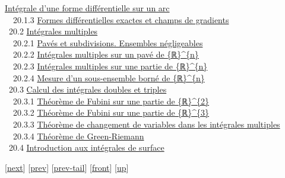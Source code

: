 \documentclass[]{article}
\begin{document}
\href{coursse104.html\#x127-59100020.1.2}{Intégrale d'une forme
différentielle sur un arc} \\ ~~20.1.3
\href{coursse104.html\#x127-59200020.1.3}{Formes différentielles exactes
et champs de gradients} \\ ~20.2
\href{coursse105.html\#x128-59300020.2}{Intégrales multiples} \\
~~20.2.1 \href{coursse105.html\#x128-59400020.2.1}{Pavés et
subdivisions. Ensembles négligeables} \\ ~~20.2.2
\href{coursse105.html\#x128-59500020.2.2}{Intégrales multiples sur un
pavé de \{ℝ\}\^{}\{n\}} \\ ~~20.2.3
\href{coursse105.html\#x128-59600020.2.3}{Intégrales multiples sur une
partie de \{ℝ\}\^{}\{n\}} \\ ~~20.2.4
\href{coursse105.html\#x128-59700020.2.4}{Mesure d'un sous-ensemble
borné de \{ℝ\}\^{}\{n\}} \\ ~20.3
\href{coursse106.html\#x129-59800020.3}{Calcul des intégrales doubles et
triples} \\ ~~20.3.1 \href{coursse106.html\#x129-59900020.3.1}{Théorème
de Fubini sur une partie de \{ℝ\}\^{}\{2\}} \\ ~~20.3.2
\href{coursse106.html\#x129-60000020.3.2}{Théorème de Fubini sur une
partie de \{ℝ\}\^{}\{3\}} \\ ~~20.3.3
\href{coursse106.html\#x129-60100020.3.3}{Théorème de changement de
variables dans les intégrales multiples} \\ ~~20.3.4
\href{coursse106.html\#x129-60200020.3.4}{Théorème de Green-Riemann} \\
~20.4 \href{coursse107.html\#x130-60300020.4}{Introduction aux
intégrales de surface}

{[}\href{coursch2.html}{next}{]} {[}\href{coursch1.html}{prev}{]}
{[}\href{coursch1.html\#tailcoursch1.html}{prev-tail}{]}
{[}\href{coursli1.html}{front}{]}
{[}\href{cours.html\#coursli1.html}{up}{]}
\end{document}
